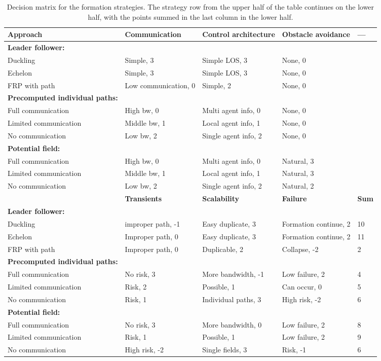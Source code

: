 \begin{sidewaystable}
\begin{tabular}{l|lll|l}
\toprule
\textbf{Approach} & \textbf{Communication} & \textbf{Control architecture} & \textbf{Obstacle avoidance} & ---\\
\hline
\textbf{Leader follower:}&&&& \\
Duckling & Simple, 3 & Simple LOS, 3 & None, 0 & \\
Echelon & Simple, 3 & Simple LOS, 3 & None, 0 & \\
\ac{FRP} with path& Low communication, 0 & Simple, 2 & None, 0 & \\
\textbf{Precomputed individual paths:}&&&& \\
Full communication& High bw, 0 & Multi agent info, 0 & None, 0 & \\
Limited communication& Middle bw, 1 & Local agent info, 1 & None, 0 & \\
No communication& Low bw, 2 & Single agent info, 2 & None, 0 & \\
\textbf{Potential field:}&&&& \\
Full communication& High bw, 0 & Multi agent info, 0 & Natural, 3 & \\
Limited communication& Middle bw, 1 & Local agent info, 1 & Natural, 3 & \\
No communication& Low bw, 2 & Single agent info, 2 & Natural, 2& \\
\bottomrule
 & \textbf{Transients} & \textbf{Scalability} & \textbf{Failure}& \textbf{Sum}\\
\hline
\textbf{Leader follower:}&&&& \\
Duckling  & improper path, -1 & Easy duplicate, 3 & Formation continue, 2 & 10\\
Echelon  & Improper path, 0 & Easy duplicate, 3 & Formation continue, 2 & 11\\
\ac{FRP} with path   & Improper path, 0 & Duplicable, 2 & Collapse, -2 & 2\\
\textbf{Precomputed individual paths:}&&&& \\
Full communication   & No risk, 3 & More bandwidth, -1 & Low failure, 2 & 4\\
Limited communication  & Risk, 2 & Possible, 1 & Can occur, 0 & 5\\
No communication   & Risk, 1 & Individual paths, 3 & High risk, -2 & 6\\
\textbf{Potential field:}&&&& \\
Full communication  & No risk, 3 & More bandwidth, 0 & Low failure, 2 & 8\\
Limited communication  & Risk, 1 & Possible, 1 & Low failure, 2 & 9\\
No communication  & High risk, -2 & Single fields, 3 & Risk, -1 & 6\\
\bottomrule
\end{tabular}
\caption{Decision matrix for the formation strategies. The strategy row from the upper half of the table continues on the lower half, with the points summed in the last column in the lower half.}
\label{tab:decision-matrix}
\end{sidewaystable}

